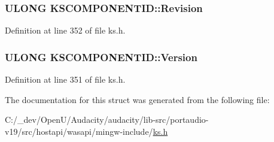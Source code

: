 \subsubsection[{\texorpdfstring{Revision}{Revision}}]{\setlength{\rightskip}{0pt plus 5cm}U\+L\+O\+NG K\+S\+C\+O\+M\+P\+O\+N\+E\+N\+T\+I\+D\+::\+Revision}\hypertarget{struct_k_s_c_o_m_p_o_n_e_n_t_i_d_a75509b7781b2ad620ce927112a26970d}{}\label{struct_k_s_c_o_m_p_o_n_e_n_t_i_d_a75509b7781b2ad620ce927112a26970d}


Definition at line 352 of file ks.\+h.

\subsubsection[{\texorpdfstring{Version}{Version}}]{\setlength{\rightskip}{0pt plus 5cm}U\+L\+O\+NG K\+S\+C\+O\+M\+P\+O\+N\+E\+N\+T\+I\+D\+::\+Version}\hypertarget{struct_k_s_c_o_m_p_o_n_e_n_t_i_d_aaf6b16bb74b0789b8c332dcefcac6885}{}\label{struct_k_s_c_o_m_p_o_n_e_n_t_i_d_aaf6b16bb74b0789b8c332dcefcac6885}


Definition at line 351 of file ks.\+h.



The documentation for this struct was generated from the following file\+:\begin{DoxyCompactItemize}
\item 
C\+:/\+\_\+dev/\+Open\+U/\+Audacity/audacity/lib-\/src/portaudio-\/v19/src/hostapi/wasapi/mingw-\/include/\hyperlink{ks_8h}{ks.\+h}\end{DoxyCompactItemize}
